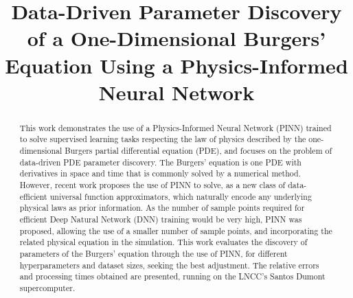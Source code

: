 \documentclass[conference]{IEEEtran}
\begin{document}

\title{Data-Driven Parameter Discovery of a One-Dimensional Burgers' Equation Using a Physics-Informed Neural Network}

\author{
	\and
	\and
}

\maketitle
\thispagestyle{plain}  %
\pagestyle{plain}

\begin{abstract}
This work demonstrates the use of a Physics-Informed Neural Network (PINN) trained to solve supervised learning tasks respecting the law of physics described by the one-dimensional Burgers partial differential equation (PDE), and focuses on the problem of data-driven PDE parameter discovery. The Burgers' equation is one PDE with derivatives in space and time that is commonly solved by a numerical method. However, recent work proposes the use of PINN to solve, as a new class of data-efficient universal function approximators, which naturally encode any underlying physical laws as prior information. As the number of sample points required for efficient Deep Natural Network (DNN) training would be very high, PINN was proposed, allowing the use of a smaller number of sample points, and incorporating the related physical equation in the simulation. This work evaluates the discovery of parameters of the Burgers' equation through the use of PINN, for different hyperparameters and dataset sizes, seeking the best adjustment. The relative errors and processing times obtained are presented, running on the LNCC's Santos Dumont supercomputer.
\end{abstract}
\end{document}
